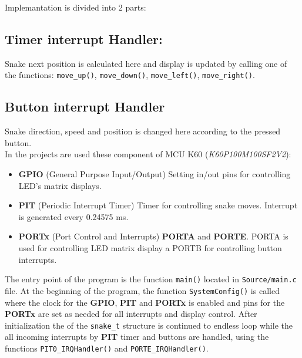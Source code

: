 \documentclass[a4paper, 11pt]{article}
\begin{document}
    Implemantation is divided into 2 parts:
    \newline

    \subsection{Timer interrupt Handler:}
    Snake next position is calculated here and display is
    updated by calling one of the functions:
    \texttt{move\_up()}, \texttt{move\_down()}, \texttt{move\_left()},
    \texttt{move\_right()}.

    \subsection{Button interrupt Handler}
    Snake direction, speed and position is changed here according to the
    pressed button.\\

    {\parindent 0pt In the projects are used these component of
    MCU K60 (\textit{K60P100M100SF2V2}):}
    \begin{itemize}
        \item \textbf{GPIO} (General Purpose Input/Output) \-
        Setting in/out pins for controlling LED's matrix displays.
        \item \textbf{PIT} (Periodic Interrupt Timer) \-
        Timer for controlling snake moves.
        Interrupt is generated every 0.24575 ms.
        \item \textbf{PORTx} (Port Control and Interrupts) \- \textbf{PORTA} and \textbf{PORTE}.
        PORTA is used for controlling LED matrix display a PORTB
        for controlling button interrupts.
    \end{itemize}

    The entry point of the program is the function \texttt{main()} located in
    \texttt{Source/main.c} file.
    At the beginning of the program, the function \texttt{SystemConfig()} is called
    where the clock for the \textbf{GPIO}, \textbf{PIT} and \textbf{PORTx} is enabled
    and pins for the \textbf{PORTx} are set as needed for all interrupts and display
    control.
    After initialization the of the \texttt{snake\_t} structure
    is continued to endless loop while the all incoming interrupts
    by \textbf{PIT} timer and buttons are handled, using the functions
    \texttt{PIT0\_IRQHandler()} and \texttt{PORTE\_IRQHandler()}.

\end{document}
